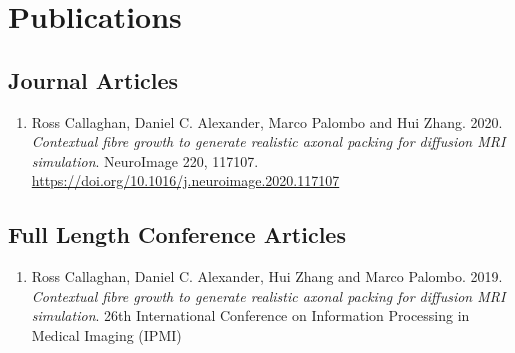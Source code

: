 


\setcounter{chapter}{1}
\chapter*{Publications}

\section*{Journal Articles}
\begin{enumerate}
\item Ross Callaghan, Daniel C. Alexander, Marco Palombo and Hui Zhang. 2020. \emph{Contextual fibre growth to generate realistic axonal packing for diffusion MRI simulation}. NeuroImage 220, 117107. \url{https://doi.org/10.1016/j.neuroimage.2020.117107}
\end{enumerate}


\section*{Full Length Conference Articles}
\begin{enumerate}

\item Ross Callaghan, Daniel C. Alexander, Hui Zhang and Marco Palombo. 2019. \emph{Contextual fibre growth to generate realistic axonal packing for diffusion MRI simulation}. 26th International Conference on Information Processing in Medical Imaging (IPMI)

\end{enumerate}


